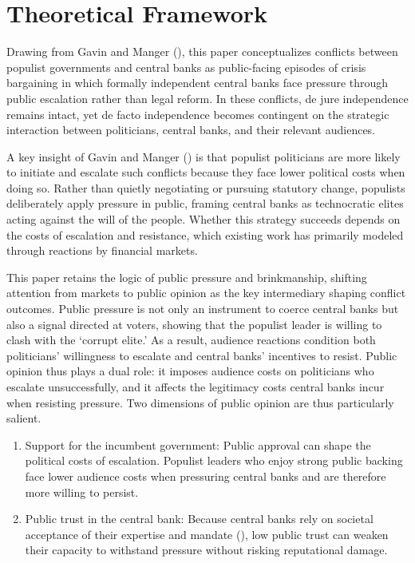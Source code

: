 \documentclass[
  11pt,
  letterpaper,
  DIV=11,
  numbers=noendperiod]{scrartcl}
\providecommand{\tightlist}{%
  \setlength{\itemsep}{0pt}\setlength{\parskip}{0pt}}
\begin{document}
\section{Theoretical Framework}\label{theoretical-framework}

Drawing from Gavin and Manger (), this
paper conceptualizes conflicts between populist governments and central
banks as public-facing episodes of crisis bargaining in which formally
independent central banks face pressure through public escalation rather
than legal reform. In these conflicts, de jure independence remains
intact, yet de facto independence becomes contingent on the strategic
interaction between politicians, central banks, and their relevant
audiences.

A key insight of Gavin and Manger () is
that populist politicians are more likely to initiate and escalate such
conflicts because they face lower political costs when doing so. Rather
than quietly negotiating or pursuing statutory change, populists
deliberately apply pressure in public, framing central banks as
technocratic elites acting against the will of the people. Whether this
strategy succeeds depends on the costs of escalation and resistance,
which existing work has primarily modeled through reactions by financial
markets.

This paper retains the logic of public pressure and brinkmanship,
shifting attention from markets to public opinion as the key
intermediary shaping conflict outcomes. Public pressure is not only an
instrument to coerce central banks but also a signal directed at voters,
showing that the populist leader is willing to clash with the `corrupt
elite.' As a result, audience reactions condition both politicians'
willingness to escalate and central banks' incentives to resist. Public
opinion thus plays a dual role: it imposes audience costs on politicians
who escalate unsuccessfully, and it affects the legitimacy costs central
banks incur when resisting pressure. Two dimensions of public opinion
are thus particularly salient.

\begin{enumerate}
\def\labelenumi{\arabic{enumi}.}
\tightlist
\item
  Support for the incumbent government: Public approval can shape the
  political costs of escalation. Populist leaders who enjoy strong
  public backing face lower audience costs when pressuring central banks
  and are therefore more willing to persist.
\item
  Public trust in the central bank: Because central banks rely on
  societal acceptance of their expertise and mandate
  (), low public
  trust can weaken their capacity to withstand pressure without risking
  reputational damage.
\end{enumerate}
\end{document}
